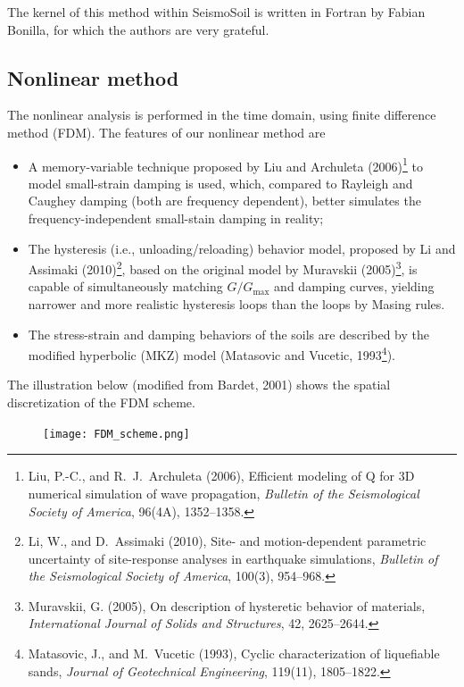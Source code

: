 \documentclass[11pt,letterpaper]{article}
\begin{document}
The kernel of this method within SeismoSoil is written in Fortran by Fabian Bonilla, for which the authors are very grateful.

\subsection{Nonlinear method}\label{sec:nonlinear}

The nonlinear analysis is performed in the time domain, using finite difference method (FDM). The features of our nonlinear method are
\begin{itemize}
	\item A memory-variable technique proposed by Liu and Archuleta (2006)\footnote{Liu, P.-C., and R.~J.~Archuleta (2006), Efficient modeling of Q for 3D numerical simulation of wave propagation, \emph{Bulletin of the Seismological Society of America}, 96(4A), 1352--1358.} to model small-strain damping is used, which, compared to Rayleigh and Caughey damping (both are frequency dependent), better simulates the frequency-independent small-stain damping in reality;
	
	\item The hysteresis (i.e., unloading/reloading) behavior model, proposed by Li and Assimaki (2010)\footnote{Li, W., and D.~Assimaki (2010), Site- and motion-dependent parametric uncertainty of site-response analyses in earthquake simulations, \emph{Bulletin of the Seismological Society of America}, 100(3), 954--968.}, based on the original model by Muravskii (2005)\footnote{Muravskii, G. (2005), On description of hysteretic behavior of materials, \emph{International Journal of Solids and Structures}, 42, 2625--2644.}, is capable of simultaneously matching $G/G_{\max}$ and damping curves, yielding narrower and more realistic hysteresis loops than the loops by Masing rules.
	
	\item The stress-strain and damping behaviors of the soils are described by the modified hyperbolic (MKZ) model (Matasovic and Vucetic, 1993\footnote{Matasovic, J., and M.~Vucetic (1993), Cyclic characterization of liquefiable sands, \emph{Journal of Geotechnical Engineering}, 119(11), 1805--1822.}).
\end{itemize}

The illustration below (modified from Bardet, 2001) shows the spatial discretization of the FDM scheme.

\begin{figure}[H]
	\centering
	\texttt{[image: FDM\_scheme.png]}\\
\end{figure}
\end{document}

